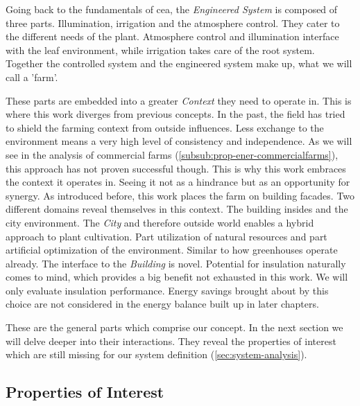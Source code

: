Going back to the fundamentals of \ac{cea}, the \textit{Engineered System} is composed of three parts.
Illumination, irrigation and the atmosphere control.
They cater to the different needs of the plant.
Atmosphere control and illumination interface with the leaf environment, while irrigation takes care of the root system.
Together the controlled system and the engineered system make up, what we will call a 'farm'.

These parts are embedded into a greater \textit{Context} they need to operate in.
This is where this work diverges from previous concepts.
In the past, the field has tried to shield the farming context from outside influences.
Less exchange to the environment means a very high level of consistency and independence.
As we will see in the analysis of commercial farms (\ref{subsub:prop-ener-commercialfarms}), this approach has not proven successful though.
This is why this work embraces the context it operates in.
Seeing it not as a hindrance but as an opportunity for synergy.
As introduced before, this work places the farm on building facades. %
Two different domains reveal themselves in this context.
The building insides and the city environment.
The \textit{City} and therefore outside world enables a hybrid approach to plant cultivation.
Part utilization of natural resources and part artificial optimization of the environment.
Similar to how greenhouses operate already. 
The interface to the \textit{Building} is novel. %
Potential for insulation naturally comes to mind, which provides a big benefit not exhausted in this work.
We will only evaluate insulation performance.
Energy savings brought about by this choice are not considered in the energy balance built up in later chapters.

These are the general parts which comprise our concept.
In the next section we will delve deeper into their interactions.
They reveal the properties of interest which are still missing for our system definition (\ref{sec:system-analysis}).

\subsection{Properties of Interest}
\label{sub:prop-of-interest}

